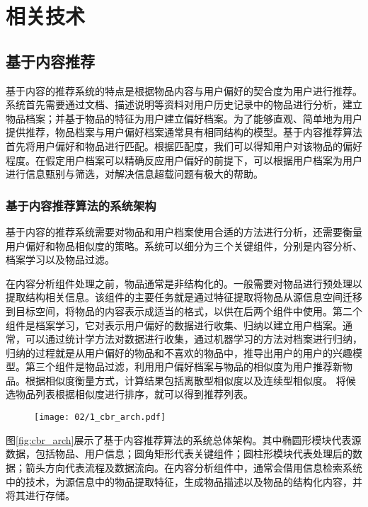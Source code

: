 
\chapter{相关技术}
\label{chap:related}

\section{基于内容推荐}

基于内容的推荐系统的特点是根据物品内容与用户偏好的契合度为用户进行推荐。系统首先需要通过文档、描述说明等资料对用户历史记录中的物品进行分析，建立物品档案；并基于物品的特征为用户建立偏好档案。为了能够直观、简单地为用户提供推荐，物品档案与用户偏好档案通常具有相同结构的模型。基于内容推荐算法首先将用户偏好和物品进行匹配。根据匹配度，我们可以得知用户对该物品的偏好程度。在假定用户档案可以精确反应用户偏好的前提下，可以根据用户档案为用户进行信息甄别与筛选，对解决信息超载问题有极大的帮助。

\subsection{基于内容推荐算法的系统架构}
基于内容的推荐系统需要对物品和用户档案使用合适的方法进行分析，还需要衡量用户偏好和物品相似度的策略。系统可以细分为三个关键组件，分别是内容分析、档案学习以及物品过滤。

在内容分析组件处理之前，物品通常是非结构化的。一般需要对物品进行预处理以提取结构相关信息。该组件的主要任务就是通过特征提取将物品从源信息空间迁移到目标空间，将物品的内容表示成适当的格式，以供在后两个组件中使用。第二个组件是档案学习，它对表示用户偏好的数据进行收集、归纳以建立用户档案。通常，可以通过统计学方法对数据进行收集，通过机器学习的方法对档案进行归纳，归纳的过程就是从用户偏好的物品和不喜欢的物品中，推导出用户的用户的兴趣模型。第三个组件是物品过滤，利用用户偏好档案与物品的相似度为用户推荐新物品。根据相似度衡量方式，计算结果包括离散型相似度以及连续型相似度。
将候选物品列表根据相似度进行排序，就可以得到推荐列表。

\begin{figure}
 \centering
 \texttt{[image: 02/1\_cbr\_arch.pdf]}
\end{figure}

图\ref{fig:cbr_arch}展示了基于内容推荐算法的系统总体架构。其中椭圆形模块代表源数据，包括物品、用户信息；圆角矩形代表关键组件；圆柱形模块代表处理后的数据；箭头方向代表流程及数据流向。在内容分析组件中，通常会借用信息检索系统中的技术，为源信息中的物品提取特征，生成物品描述以及物品的结构化内容，并将其进行存储。

